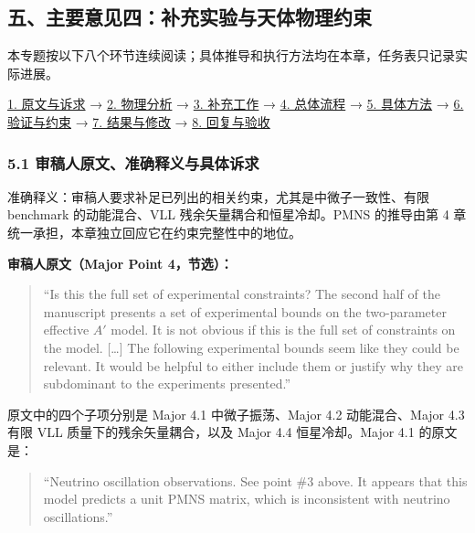 \documentclass[
]{article}
\begin{document}
\subsection{五、主要意见四：补充实验与天体物理约束}\label{ux4e94ux4e3bux8981ux610fux89c1ux56dbux8865ux5145ux5b9eux9a8cux4e0eux5929ux4f53ux7269ux7406ux7ea6ux675f}

本专题按以下八个环节连续阅读；具体推导和执行方法均在本章，任务表只记录实际进展。

\hyperref[major-4-step-1]{1. 原文与诉求} → \hyperref[major-4-step-2]{2.
物理分析} → \hyperref[major-4-step-3]{3. 补充工作} →
\hyperref[major-4-step-4]{4. 总体流程} → \hyperref[major-4-step-5]{5.
具体方法} → \hyperref[major-4-step-6]{6. 验证与约束} →
\hyperref[major-4-step-7]{7. 结果与修改} → \hyperref[major-4-step-8]{8.
回复与验收}

\subsubsection{5.1
审稿人原文、准确释义与具体诉求}\label{ux5ba1ux7a3fux4ebaux539fux6587ux51c6ux786eux91caux4e49ux4e0eux5177ux4f53ux8bc9ux6c42-3}

准确释义：审稿人要求补足已列出的相关约束，尤其是中微子一致性、有限
benchmark 的动能混合、VLL 残余矢量耦合和恒星冷却。PMNS 的推导由第 4
章统一承担，本章独立回应它在约束完整性中的地位。

\textbf{审稿人原文（Major Point 4，节选）：}

\begin{quote}
``Is this the full set of experimental constraints? The second half of
the manuscript presents a set of experimental bounds on the
two-parameter effective \(A'\) model. It is not obvious if this is the
full set of constraints on the model. {[}\ldots{]} The following
experimental bounds seem like they could be relevant. It would be
helpful to either include them or justify why they are subdominant to
the experiments presented.''
\end{quote}

原文中的四个子项分别是 Major 4.1 中微子振荡、Major 4.2 动能混合、Major
4.3 有限 VLL 质量下的残余矢量耦合，以及 Major 4.4 恒星冷却。Major 4.1
的原文是：

\begin{quote}
``Neutrino oscillation observations. See point \#3 above. It appears
that this model predicts a unit PMNS matrix, which is inconsistent with
neutrino oscillations.''
\end{quote}
\end{document}
